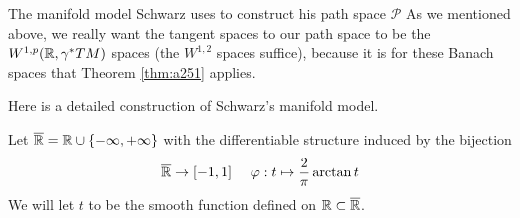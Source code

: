 \documentclass{amsart}
\begin{document}
\begin{clear}{The manifold model Schwarz uses to construct his path
    space $\mathscr{P}$}
  As we mentioned above, we really want the tangent spaces to our
  path space to be the $W^{1,p}(\mathbb{R},\gamma^{*}TM)$ spaces (the
  $W^{1,2}$ spaces suffice), because it is for these Banach spaces
  that Theorem \ref{thm:a251} applies.

  Here is a detailed construction
  of Schwarz's manifold model.
  \begin{defn}
  Let $\overline{\mathbb{R}}=\mathbb{R}\cup\left\{-\infty,+\infty\right\}$ with the differentiable structure induced by the bijection
  \begin{equation*}
    \overline{\mathbb{R}}\to [-1,1]\ \ \ \ \varphi:t\mapsto \frac{2}{\pi}\arctan t
  \end{equation*}
  We will let $t$ to be the smooth function defined on $\mathbb{R}\subset \overline{\mathbb{R}}$.


\end{defn}
\end{clear}
\end{document}
